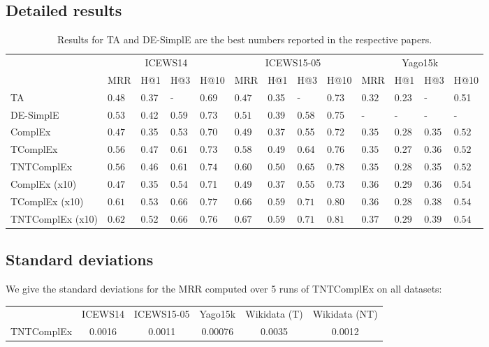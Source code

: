 \documentclass{article}
\begin{document}
\subsection{Detailed results}
\begin{table}[h]
\begin{small}
\begin{tabular}{l|p{0.45cm}p{0.45cm}p{0.45cm}p{0.7cm}|p{0.45cm}p{0.45cm}p{0.45cm}p{0.65cm}|p{0.45cm}p{0.45cm}p{0.45cm}p{0.7cm}}
\toprule
{} &  \multicolumn{4}{c}{ICEWS14} & \multicolumn{4}{c}{ICEWS15-05} & \multicolumn{4}{c}{Yago15k}\\
{} & MRR & H@1 & H@3 & H@10 & MRR & H@1 & H@3 & H@10 & MRR & H@1 & H@3 & H@10 \\
TA & $0.48$ & 0.37 & - & 0.69 & $0.47$ & 0.35 & - & 0.73 & $0.32$ & 0.23 & - & 0.51  \\
DE-SimplE & $0.53$ & 0.42 & 0.59 & 0.73 & $0.51$ & 0.39 & 0.58 & 0.75 & - & - & - & -\\
ComplEx & $0.47$& 0.35 & 0.53 & 0.70 & $0.49$& 0.37 & 0.55 & 0.72 & $\mathbf{0.35}$& $\mathbf{0.28}$ & $\mathbf{0.35}$ & $\mathbf{0.52}$ \\
\midrule
TComplEx & $\mathbf{0.56}$ & $\mathbf{0.47}$ & $\mathbf{0.61}$ & 0.73 & $0.58$& 0.49 & 0.64 & 0.76 & $\mathbf{0.35}$& 0.27 & $\mathbf{0.36}$ & $\mathbf{0.52}$\\
TNTComplEx & $\mathbf{0.56}$ &0.46 &$\mathbf{0.61}$ &$\mathbf{0.74}$ & $\mathbf{0.60}$ & $\mathbf{0.50}$ & $\mathbf{0.65}$ & $\mathbf{0.78}$ & $\mathbf{0.35}$ & $\mathbf{0.28}$ & 0.35 & $\mathbf{0.52}$\\
\midrule
ComplEx (x10) & $0.47$ & 0.35 & 0.54 & 0.71 & $0.49$ & 0.37 & 0.55 & 0.73 & $0.36$ & $\mathbf{0.29}$ & 0.36 & $\mathbf{0.54}$ \\
TComplEx (x10) & $0.61$ & $\mathbf{0.53}$ & $\mathbf{0.66}$ & $\mathbf{0.77}$ & $0.66$ & $\mathbf{0.59}$ & $\mathbf{0.71}$ & 0.80 & $0.36$ & 0.28 & 0.38 & $\mathbf{0.54}$ \\
TNTComplEx (x10) & $\mathbf{0.62}$ & 0.52 & $\mathbf{0.66}$ & 0.76 & $\mathbf{0.67}$ & $\mathbf{0.59}$ & $\mathbf{0.71}$ & $\mathbf{0.81}$ & $\mathbf{0.37}$ & $\mathbf{0.29}$ & $\mathbf{0.39}$ & $\mathbf{0.54}$\\
\bottomrule
\end{tabular}
\caption{Results for TA \citep{garcia2018learning} and DE-SimplE \citep{goel2019diachronic} are the best numbers reported in the respective papers.}
\end{small}
\end{table}
\subsection{Standard deviations}
We give the standard deviations for the MRR computed over 5 runs of TNTComplEx on all datasets:
\begin{tabular}{lccccc}
\toprule
{} &  ICEWS14 & ICEWS15-05 & Yago15k & Wikidata (T) & Wikidata (NT)\\
TNTComplEx & 0.0016 & 0.0011 & 0.00076 & 0.0035 & 0.0012\\
\bottomrule
\end{tabular}
\end{document}
